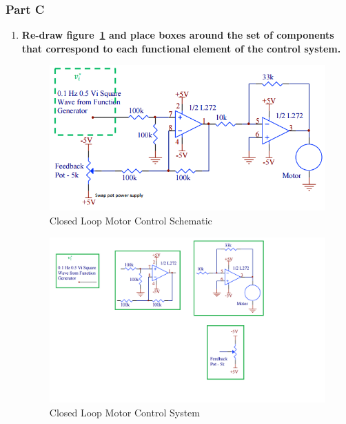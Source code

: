 \documentclass[11pt,a4paper]{article}
\begin{document}
\pagebreak
\subsubsection{Part C}
\label{sec:c}
\begin{enumerate}
	\item \textbf{Re-draw figure~\ref{fig:c1_2_} and place boxes around the set of components that  correspond to each functional element of the control system.} \\
    
	\begin{figure}[H]
	\centering
	\includegraphics[width=.8\textwidth]{FigsC/c1_2_.png}
	\caption{\label{fig:c1_2_}Closed Loop Motor Control Schematic}
	\end{figure}
    
    \begin{figure}[H]
	\centering
	\includegraphics[width=.8\textwidth]{FigsC/c1.png}
	\caption{\label{fig:c1}Closed Loop Motor Control System}
	\end{figure}
    
    
    

\end{enumerate}
\end{document}
